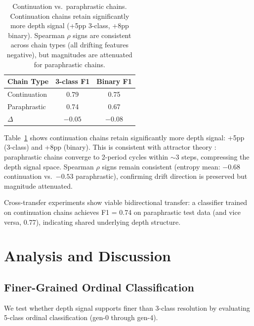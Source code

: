 \documentclass[11pt,a4paper]{article}
\begin{document}
\begin{table}[t]
\centering
\small
\begin{tabular}{lcc}
\toprule
\textbf{Chain Type} & \textbf{3-class F1} & \textbf{Binary F1} \\
\midrule
Continuation    & 0.79 & 0.75 \\
Paraphrastic    & 0.74 & 0.67 \\
\midrule
$\Delta$        & $-0.05$ & $-0.08$ \\
\bottomrule
\end{tabular}
\caption{Continuation vs.\ paraphrastic chains. Continuation chains retain significantly more depth signal (+5pp 3-class, +8pp binary). Spearman $\rho$ signs are consistent across chain types (all drifting features negative), but magnitudes are attenuated for paraphrastic chains.}
\label{tab:paraphrastic}
\end{table}

Table~\ref{tab:paraphrastic} shows continuation chains retain significantly more depth signal: +5pp (3-class) and +8pp (binary). This is consistent with attractor theory \cite{kovacs2025attractor}: paraphrastic chains converge to 2-period cycles within ${\sim}$3 steps, compressing the depth signal space. Spearman $\rho$ signs remain consistent (entropy mean: $-0.68$ continuation vs.\ $-0.53$ paraphrastic), confirming drift direction is preserved but magnitude attenuated.

Cross-transfer experiments show viable bidirectional transfer: a classifier trained on continuation chains achieves F1 = 0.74 on paraphrastic test data (and vice versa, 0.77), indicating shared underlying depth structure.

\section{Analysis and Discussion}

\subsection{Finer-Grained Ordinal Classification}

We test whether depth signal supports finer than 3-class resolution by evaluating 5-class ordinal classification (gen-0 through gen-4).
\end{document}

